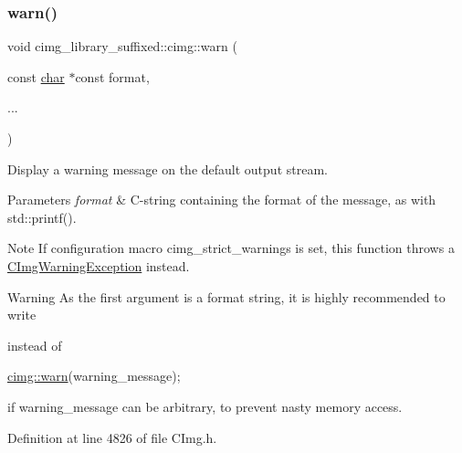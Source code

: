 \subsubsection{\texorpdfstring{warn()}{warn()}}
{\footnotesize\ttfamily void cimg\+\_\+library\+\_\+suffixed\+::cimg\+::warn (\begin{DoxyParamCaption}\item[{const \hyperlink{classchar}{char} $\ast$const}]{format,  }\item[{}]{... }\end{DoxyParamCaption})\hspace{0.3cm}{\ttfamily [inline]}}



Display a warning message on the default output stream. 


\begin{DoxyParams}{Parameters}
{\em format} & C-\/string containing the format of the message, as with {\ttfamily std\+::printf()}. \\
\hline
\end{DoxyParams}
\begin{DoxyNote}{Note}
If configuration macro {\ttfamily cimg\+\_\+strict\+\_\+warnings} is set, this function throws a {\ttfamily \hyperlink{structcimg__library__suffixed_1_1CImgWarningException}{C\+Img\+Warning\+Exception}} instead. 
\end{DoxyNote}
\begin{DoxyWarning}{Warning}
As the first argument is a format string, it is highly recommended to write 
 instead of 
\begin{DoxyCode}
\hyperlink{namespacecimg__library__suffixed_1_1cimg_acfd3624d72ed7f79c82ec45646c685e7}{cimg::warn}(warning\_message);
\end{DoxyCode}
 if {\ttfamily warning\+\_\+message} can be arbitrary, to prevent nasty memory access. 
\end{DoxyWarning}


Definition at line 4826 of file C\+Img.\+h.



